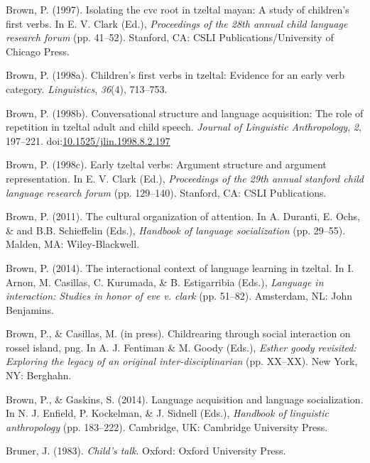 \documentclass[floatsintext,man]{apa6}
\theoremstyle{definition}
\theoremstyle{definition}
\theoremstyle{definition}
\theoremstyle{remark}
\begin{document}
\hypertarget{ref-brown1997isolating}{}
Brown, P. (1997). Isolating the cvc root in tzeltal mayan: A study of
children's first verbs. In E. V. Clark (Ed.), \emph{Proceedings of the
28th annual child language research forum} (pp. 41--52). Stanford, CA:
CSLI Publications/University of Chicago Press.

\hypertarget{ref-brown1998childrens}{}
Brown, P. (1998a). Children's first verbs in tzeltal: Evidence for an
early verb category. \emph{Linguistics}, \emph{36}(4), 713--753.

\hypertarget{ref-brown1998conversational}{}
Brown, P. (1998b). Conversational structure and language acquisition:
The role of repetition in tzeltal adult and child speech. \emph{Journal
of Linguistic Anthropology}, \emph{2}, 197--221.
doi:\href{https://doi.org/10.1525/jlin.1998.8.2.197}{10.1525/jlin.1998.8.2.197}

\hypertarget{ref-brown1998early}{}
Brown, P. (1998c). Early tzeltal verbs: Argument structure and argument
representation. In E. V. Clark (Ed.), \emph{Proceedings of the 29th
annual stanford child language research forum} (pp. 129--140). Stanford,
CA: CSLI Publications.

\hypertarget{ref-brown2011cultural}{}
Brown, P. (2011). The cultural organization of attention. In A. Duranti,
E. Ochs, \& and B.B. Schieffelin (Eds.), \emph{Handbook of language
socialization} (pp. 29--55). Malden, MA: Wiley-Blackwell.

\hypertarget{ref-brown2014interactional}{}
Brown, P. (2014). The interactional context of language learning in
tzeltal. In I. Arnon, M. Casillas, C. Kurumada, \& B. Estigarribia
(Eds.), \emph{Language in interaction: Studies in honor of eve v. clark}
(pp. 51--82). Amsterdam, NL: John Benjamins.

\hypertarget{ref-brownIPchildrearing}{}
Brown, P., \& Casillas, M. (in press). Childrearing through social
interaction on rossel island, png. In A. J. Fentiman \& M. Goody (Eds.),
\emph{Esther goody revisited: Exploring the legacy of an original
inter-disciplinarian} (pp. XX--XX). New York, NY: Berghahn.

\hypertarget{ref-brown2014language}{}
Brown, P., \& Gaskins, S. (2014). Language acquisition and language
socialization. In N. J. Enfield, P. Kockelman, \& J. Sidnell (Eds.),
\emph{Handbook of linguistic anthropology} (pp. 183--222). Cambridge,
UK: Cambridge University Press.

\hypertarget{ref-bruner1983childs}{}
Bruner, J. (1983). \emph{Child's talk}. Oxford: Oxford University Press.
\end{document}
